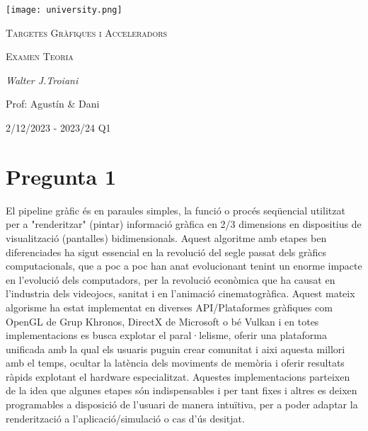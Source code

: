 \documentclass[12pt]{article}
\begin{document}
\begin{titlepage}
	\centering
	\texttt{[image: university.png]}\par\vspace{1cm}
	{\scshape\LARGE Targetes Gràfiques i Acceleradors \par}
	\vspace{1cm}
	{\scshape\Large Examen Teoria \par}
	\vspace{1.5cm}
	{\Large\itshape Walter J.Troiani\par}
	\vfill
	Prof: Agustín \& Dani \par
    \vspace{1cm}
    2/12/2023 - 2023/24 Q1\par
	\vspace{1cm}

\end{titlepage}

\newpage

\section{Pregunta 1}

El pipeline gràfic és en paraules simples, la funció o procés seqüencial utilitzat per a "renderitzar" (pintar) informació gràfica en 2/3 dimensions en dispositius de visualització (pantalles)
bidimensionals. Aquest algoritme amb etapes ben diferenciades ha sigut essencial en la revolució del segle passat dels gràfics computacionals, que a poc a poc han anat evolucionant tenint un enorme impacte
en l'evolució dels computadors, per la revolució econòmica que ha causat en l'industria dels videojocs, sanitat i en l'animació cinematogràfica. Aquest mateix algorisme ha estat implementat
en diverses API/Plataformes gràfiques com OpenGL de Grup Khronos, DirectX de Microsoft o bé Vulkan i en totes implementacions es busca explotar el paral·lelisme, oferir una plataforma unificada
amb la qual els usuaris puguin crear comunitat i aixi aquesta millori amb el temps, ocultar la latència dels moviments de memòria i oferir resultats ràpids explotant el hardware especialitzat.
Aquestes implementacions parteixen de la idea que algunes etapes són indispensables i per tant fixes i altres es deixen programables a disposició de l'usuari de manera intuïtiva, per a poder
adaptar la renderització a l'aplicació/simulació o cas d'ús desitjat.
\\
\end{document}
